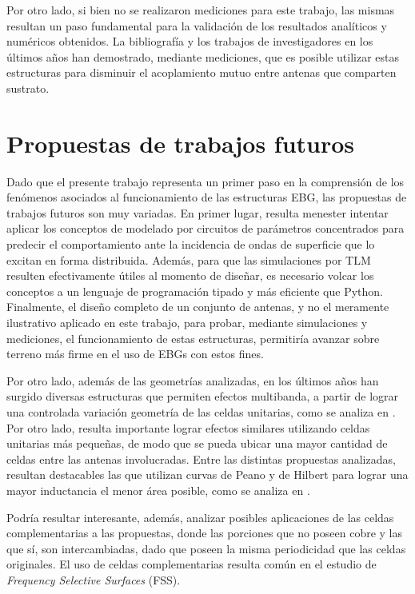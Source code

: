 Por otro lado, si bien no se realizaron mediciones para este trabajo, las mismas resultan un paso fundamental para la validación de los resultados analíticos y numéricos obtenidos. La bibliografía y los trabajos de investigadores en los últimos años han demostrado, mediante mediciones, que es posible utilizar estas estructuras para disminuir el acoplamiento mutuo entre antenas que comparten sustrato.

\section{Propuestas de trabajos futuros}

Dado que el presente trabajo representa un primer paso en la comprensión de los fenómenos asociados al funcionamiento de las estructuras EBG, las propuestas de trabajos futuros son muy variadas. En primer lugar, resulta menester intentar aplicar los conceptos de modelado por circuitos de parámetros concentrados para predecir el comportamiento ante la incidencia de ondas de superficie que lo excitan en forma distribuida. Además, para que las simulaciones por TLM resulten efectivamente útiles al momento de diseñar, es necesario volcar los conceptos a un lenguaje de programación tipado y más eficiente que Python. Finalmente, el diseño completo de un conjunto de antenas, y no el meramente ilustrativo aplicado en este trabajo, para probar, mediante simulaciones y mediciones, el funcionamiento de estas estructuras, permitiría avanzar sobre terreno más firme en el uso de EBGs con estos fines.

Por otro lado, además de las geometrías analizadas, en los últimos años han surgido diversas estructuras que permiten efectos multibanda, a partir de lograr una controlada variación geometría de las celdas unitarias, como se analiza en \cite{Kern:multiband}. Por otro lado, resulta importante lograr efectos similares utilizando celdas unitarias más pequeñas, de modo que se pueda ubicar una mayor cantidad de celdas entre las antenas involucradas. Entre las distintas propuestas analizadas, resultan destacables las que utilizan curvas de Peano y de Hilbert para lograr una mayor inductancia el menor área posible, como se analiza en \cite{McVay:Peano}.

Podría resultar interesante, además, analizar posibles aplicaciones de las celdas complementarias a las propuestas, donde las porciones que no poseen cobre y las que sí, son intercambiadas, dado que poseen la misma periodicidad que las celdas originales. El uso de celdas complementarias resulta común en el estudio de \textit{Frequency Selective Surfaces} (FSS).

